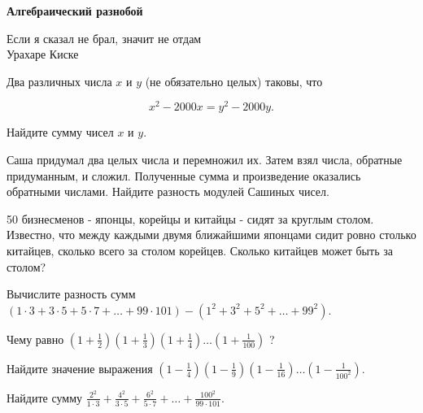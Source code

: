\centerline{\bf \Huge Алгебраический разнобой}

\begin{flushright}
        \scriptsize{Если я сказал не брал, значит не отдам\\ Урахаре Киске}
\end{flushright}

Два различных числа $x$ и $y$ (не обязательно целых) таковы, что

$$
x^2-2000 x=y^2-2000 y .
$$


Найдите сумму чисел $x$ и $y$.

Саша придумал два целых числа и перемножил их. Затем взял числа, обратные придуманным, и сложил. Полученные сумма и произведение оказались обратными числами. Найдите разность модулей Сашиных чисел.

50 бизнесменов - японцы, корейцы и китайцы - сидят за круглым столом. Известно, что между каждыми двумя ближайшими японцами сидит ровно столько китайцев, сколько всего за столом корейцев. Сколько китайцев может быть за столом?


Вычислите разность сумм $(1 \cdot 3+3 \cdot 5+5 \cdot 7+\ldots+99 \cdot 101)-\left(1^2+3^2+5^2+\ldots+99^2\right)$.

Чему равно $\left(1+\frac{1}{2}\right)\left(1+\frac{1}{3}\right)\left(1+\frac{1}{4}\right) \ldots\left(1+\frac{1}{100}\right)$ ?


Найдите значение выражения $\left(1-\frac{1}{4}\right)\left(1-\frac{1}{9}\right)\left(1-\frac{1}{16}\right) \ldots\left(1-\frac{1}{100^2}\right)$.


Найдите сумму $\frac{2^2}{1 \cdot 3}+\frac{4^2}{3 \cdot 5}+\frac{6^2}{5 \cdot 7}+\ldots+\frac{100^2}{99 \cdot 101}$.